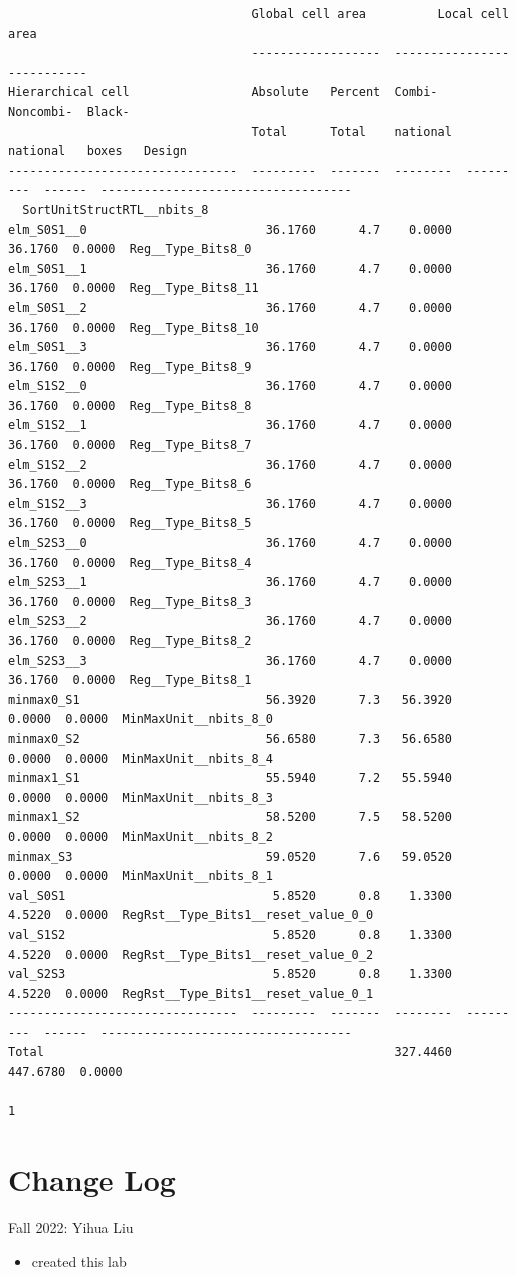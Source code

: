 \documentclass[a4paper,12pt,twoside]{article}
\begin{document}
\begin{verbatim}
                                  Global cell area          Local cell area
                                  ------------------  ---------------------------
Hierarchical cell                 Absolute   Percent  Combi-    Noncombi-  Black-
                                  Total      Total    national  national   boxes   Design
--------------------------------  ---------  -------  --------  ---------  ------  -----------------------------------
  SortUnitStructRTL__nbits_8
elm_S0S1__0                         36.1760      4.7    0.0000    36.1760  0.0000  Reg__Type_Bits8_0
elm_S0S1__1                         36.1760      4.7    0.0000    36.1760  0.0000  Reg__Type_Bits8_11
elm_S0S1__2                         36.1760      4.7    0.0000    36.1760  0.0000  Reg__Type_Bits8_10
elm_S0S1__3                         36.1760      4.7    0.0000    36.1760  0.0000  Reg__Type_Bits8_9
elm_S1S2__0                         36.1760      4.7    0.0000    36.1760  0.0000  Reg__Type_Bits8_8
elm_S1S2__1                         36.1760      4.7    0.0000    36.1760  0.0000  Reg__Type_Bits8_7
elm_S1S2__2                         36.1760      4.7    0.0000    36.1760  0.0000  Reg__Type_Bits8_6
elm_S1S2__3                         36.1760      4.7    0.0000    36.1760  0.0000  Reg__Type_Bits8_5
elm_S2S3__0                         36.1760      4.7    0.0000    36.1760  0.0000  Reg__Type_Bits8_4
elm_S2S3__1                         36.1760      4.7    0.0000    36.1760  0.0000  Reg__Type_Bits8_3
elm_S2S3__2                         36.1760      4.7    0.0000    36.1760  0.0000  Reg__Type_Bits8_2
elm_S2S3__3                         36.1760      4.7    0.0000    36.1760  0.0000  Reg__Type_Bits8_1
minmax0_S1                          56.3920      7.3   56.3920     0.0000  0.0000  MinMaxUnit__nbits_8_0
minmax0_S2                          56.6580      7.3   56.6580     0.0000  0.0000  MinMaxUnit__nbits_8_4
minmax1_S1                          55.5940      7.2   55.5940     0.0000  0.0000  MinMaxUnit__nbits_8_3
minmax1_S2                          58.5200      7.5   58.5200     0.0000  0.0000  MinMaxUnit__nbits_8_2
minmax_S3                           59.0520      7.6   59.0520     0.0000  0.0000  MinMaxUnit__nbits_8_1
val_S0S1                             5.8520      0.8    1.3300     4.5220  0.0000  RegRst__Type_Bits1__reset_value_0_0
val_S1S2                             5.8520      0.8    1.3300     4.5220  0.0000  RegRst__Type_Bits1__reset_value_0_2
val_S2S3                             5.8520      0.8    1.3300     4.5220  0.0000  RegRst__Type_Bits1__reset_value_0_1
--------------------------------  ---------  -------  --------  ---------  ------  -----------------------------------
Total                                                 327.4460   447.6780  0.0000

1
\end{verbatim}

\section{Change Log}
Fall 2022: Yihua Liu
\begin{itemize}
    \item created this lab
\end{itemize}

\printbibliography
\end{document}
